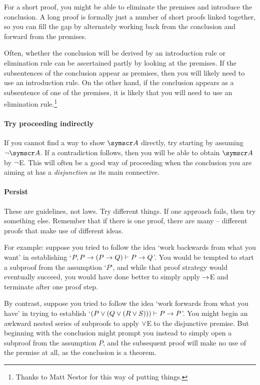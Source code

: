 For a short proof, you might be able to eliminate the premises and introduce the conclusion. A long proof is formally just a number of short proofs linked together, so you can fill the gap by alternately working back from the conclusion and forward from the premises.

Often, whether the conclusion will be derived by an introduction rule or elimination rule can be ascertained partly by looking at the premises. If the subsentences of the conclusion appear as premises, then you will likely need to use an introduction rule. On the other hand, if the conclusion appears as a subsentence of one of the premises, it is likely that you will need to use an elimination rule.\footnote{Thanks to Matt Nestor for this way of putting things.}

\paragraph{Try proceeding indirectly}
If you cannot find a way to show $\meta{A}$ directly, try starting by assuming $\enot \meta{A}$. If a contradiction follows, then you will be able to obtain $\meta{A}$ by $\neg$E. This will often be a good way of proceeding when the conclusion you are aiming at has a \emph{disjunction} as its main connective.  

\paragraph{Persist}
These are guidelines, not laws. Try different things. If one approach fails, then try something else. Remember that if there is one proof, there are many – different proofs that make use of different ideas.

For example: suppose you tried to follow the idea `work backwards from what you want' in establishing `$P, P \rightarrow (P \rightarrow Q) \vdash P \rightarrow Q$'. You would be tempted to start a subproof from the assumption `$P$', and while that proof strategy would eventually succeed, you would have done better to simply apply $\rightarrow$E and terminate after one proof step.

By contrast, suppose you tried to follow the idea `work forwards from what you have' in trying to establish `$(P \vee (Q \vee (R \vee S))) \vdash P \rightarrow P$'. You might begin an awkward nested series of subproofs to apply $\vee$E to the disjunctive premise. But beginning with the conclusion might prompt you instead to simply open a subproof from the assumption $P$, and the subsequent proof will make no use of the premise at all, as the conclusion is a theorem.

